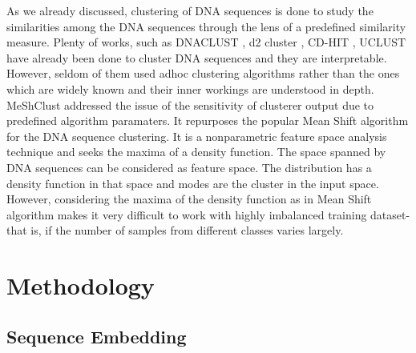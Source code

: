 \documentclass[oneside, twocolumn, a4paper, 10pt]{IEEEtran}
\begin{document}
\par
As we already discussed, clustering of DNA sequences is done to study the similarities among the DNA sequences through the lens of a predefined similarity measure. Plenty of works, such as DNACLUST \cite{11}, d2 cluster \cite{12}, CD-HIT \cite{13}, UCLUST \cite{14} have already been done to cluster DNA sequences and they are interpretable. However, seldom of them used adhoc clustering algorithms rather than the ones which are widely known and their inner workings are understood in depth. MeShClust \cite{15} addressed the issue of the sensitivity of clusterer output due to predefined algorithm paramaters. It repurposes the popular Mean Shift algorithm \cite{16} for the DNA sequence clustering. It is a nonparametric feature space analysis technique and seeks the maxima of a density function. The space spanned by DNA sequences can be considered as feature space. The distribution has a density function in that space and modes are the cluster in the input space. However, considering the maxima of the density function as in Mean Shift algorithm makes it very difficult to work with highly imbalanced training dataset- that is, if the number of samples from different classes varies largely.
\section{Methodology}
\subsection{Sequence Embedding}
\end{document}
